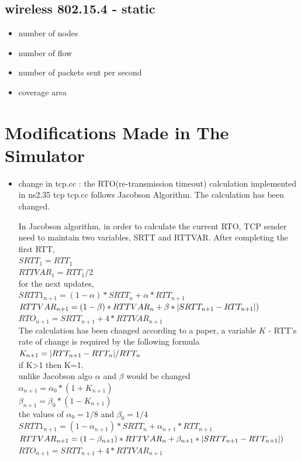 \documentclass[12pt]{article}
\begin{document}
\subsection{wireless 802.15.4 - static}
\begin{itemize}
	\item number of nodes
	\item number of flow
	\item number of packets sent per second
	\item coverage area
\end{itemize}

\section{Modifications Made in The Simulator}
\begin{itemize}
    \item change in tcp.cc : the RTO(re-transmission timeout) calculation implemented in ns2.35 \textrightarrow tcp \textrightarrow tcp.cc follows Jacobson Algorithm. The calculation has been changed.
    
    In Jacobson algorithm, in order to calculate the current RTO, TCP sender need to maintain two variables, SRTT and RTTVAR. After completing the first RTT,\\
    $SRTT_1 = RTT_1$\\
    $RTTVAR_1 = RTT_1/2$\\
    
    for the next updates,\\
    $SRTT1_{n+1} = (1 - \alpha) * SRTT_n + \alpha * RTT_{n+1}$\\
    $RTTVAR_{n+1} = (1 - \beta) * RTTVAR_n + \beta*\abs{SRTT_{n+1} - RTT_{n+1}})$\\
    $RTO_{n+1} = SRTT_{n+1} + 4 * RTTVAR_{n+1}$\\
    
    The calculation has been changed according to a paper,
    a variable $K$ - RTT's rate of change is required by the following formula
    $K_{n+1} = \abs{RTT_{n+1} - RTT_n} / RTT_n$\\
    if K\textgreater 1 then K=1.\\
    unlike Jacobson algo $\alpha$ and $\beta$ would be changed\\
    $\alpha_{n+1} = \alpha_0 * (1 + K_{n+1})$\\
    $\beta_{n+1} = \beta_0 * (1 - K_{n+1})$\\
    the values of $\alpha_0=1/8$ and $\beta_0=1/4$\\
    $SRTT1_{n+1} = (1 - \alpha_{n+1}) * SRTT_n + \alpha_{n+1} * RTT_{n+1}$\\
    $RTTVAR_{n+1} = (1 - \beta_{n+1}) * RTTVAR_n + \beta_{n+1}*\abs{SRTT_{n+1} - RTT_{n+1}})$\\
    $RTO_{n+1} = SRTT_{n+1} + 4 * RTTVAR_{n+1}$\\
    

\end{itemize}
\end{document}

